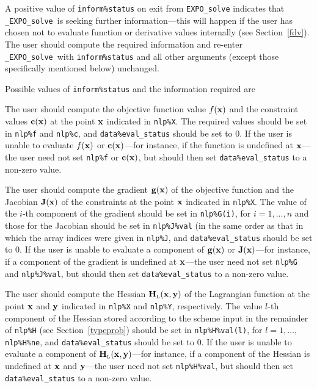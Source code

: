\documentclass{galahad}
\newcommand{\packagename}{EXPO}
\newcommand{\fullpackagename}{\libraryname\_\packagename}
\newcommand{\solver}{{\tt \fullpackagename\_solve}}
\newcommand{\bmHL}{\bmH\sub{L}}
\begin{document}
A positive value of {\tt inform\%status} on exit from
{\tt \packagename\_solve}
indicates that
\solver\ is seeking further information---this will happen
if the user has chosen not to evaluate function or
derivative values internally (see Section~\ref{fdv}).
The user should compute the required information and re-enter \solver\
with {\tt inform\%status} and all other arguments (except those specifically
mentioned below) unchanged.

Possible values of {\tt inform\%status} and the information required are
\begin{description}
 The user should compute the objective function value $f({\mathbf{x}})$ 
     and the constraint values ${\mathbf{c}}({\mathbf{x}})$ at the point ${\mathbf{x}}$ indicated 
     in {\tt nlp\%X}.
     The required values should be set in {\tt nlp\%f} and {\tt nlp\%c}, and
     {\tt data\%eval\_status} should be set to 0. If the user is
     unable to evaluate $f({\mathbf{x}})$ or ${\mathbf{c}}({\mathbf{x}})$---for instance, if the 
     function is undefined at ${\mathbf{x}}$---the user need not set {\tt nlp\%f}
     or ${\mathbf{c}}({\mathbf{x}})$, but
     should then set {\tt data\%eval\_status} to a non-zero value.

 The user should compute the gradient ${\mathbf{g}}({\mathbf{x}})$ of the 
     objective function and the Jacobian ${\mathbf{J}}({\mathbf{x}})$ of the constraints
     at the point ${\mathbf{x}}$ indicated in {\tt nlp\%X}.
     The value of the $i$-th component of the gradient should be set
     in {\tt nlp\%G(i)}, for $i = 1, \ldots, n$ and those for the
     Jacobian should be set in  {\tt nlp\%J\%val}
     (in the same order as that in which the array indices were given 
     in {\tt nlp\%J},  and {\tt data\%eval\_status} should be set to 0. 
     If the user is unable to evaluate a component of ${\mathbf{g}}({\mathbf{x}})$ or 
     ${\mathbf{J}}({\mathbf{x}})$---for  instance, if a component of the gradient is
     undefined at ${\mathbf{x}}$---the user need not set {\tt nlp\%G} and 
     {\tt nlp\%J\%val}, but  should then set {\tt data\%eval\_status} 
     to a non-zero value.

 The user should compute the Hessian $\bmHL(\bmx,\bmy)$
     of the Lagrangian function at the point ${\mathbf{x}}$ and ${\mathbf{y}}$
     indicated in {\tt nlp\%X} and {\tt nlp\%Y}, respectively.
     The value $l$-th component of the Hessian stored according to the
     scheme input in the remainder of {\tt nlp\%H} (see Section~\ref{typeprob})
     should be set in {\tt nlp\%H\%val(l)}, for $l = 1, \ldots,$ 
     {\tt nlp\%H\%ne}, and {\tt data\%eval\_status} should be set to 0. 
     If the user is  unable to evaluate a component of $\bmHL(\bmx,\bmy)$---for
     instance, if a component of the Hessian is
     undefined at ${\mathbf{x}}$ and ${\mathbf{y}}$---the user need not set
     {\tt nlp\%H\%val}, but should then set {\tt data\%eval\_status} 
     to a non-zero value.


\end{description}
\end{document}
